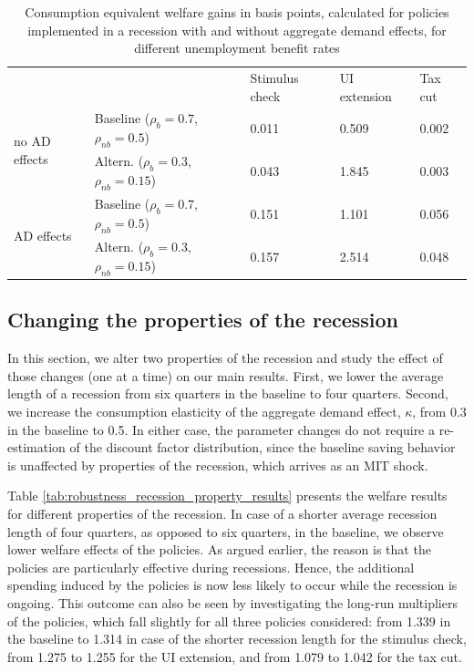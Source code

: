 \documentclass[\econtexRoot/HAFiscal]{subfiles}
\begin{document}
\begin{table}[]
  \begin{center}
    \begin{tabular}{@{}lllll@{}}
      \toprule
      &                    & Stimulus check & UI extension & Tax cut \\ \cmidrule(l){1-5} 
      \multirow{2}{*}{no AD effects} 	& Baseline  ($\rho_{b}=0.7$, $\rho_{nb}=0.5$) 		& 0.011          & 0.509        & 0.002   \\
      & Altern.  ($\rho_{b}=0.3$, $\rho_{nb}=0.15$) 	& 0.043          & 1.845        & 0.003   \\ \cmidrule(l){1-5} 
      \multirow{2}{*}{AD effects}		& Baseline  ($\rho_{b}=0.7$, $\rho_{nb}=0.5$)    	& 0.151          & 1.101        & 0.056   \\
      & Altern.  ($\rho_{b}=0.3$, $\rho_{nb}=0.15$)    & 0.157          & 2.514        & 0.048   \\ \cmidrule(l){1-5} 
    \end{tabular}
    \caption{Consumption equivalent welfare gains in basis points, calculated for policies implemented in a recession with and without aggregate demand effects, for different unemployment benefit rates}
    \notinsubfile{\label{tab:robustness_benefit_results}}
  \end{center}
\end{table}




\FloatBarrier
\hypertarget{changing-the-properties-of-the-recession}{}\par\subsection{Changing the properties of the recession}

In this section, we alter two properties of the recession and study the effect of those changes (one at a time) on our main results. First, we lower the average length of a recession from six quarters in the baseline to four quarters. Second, we increase the consumption elasticity of the aggregate demand effect, $\kappa$, from 0.3 in the baseline to 0.5. In either case, the parameter changes do not require a re-estimation of the discount factor distribution, since the baseline saving behavior is unaffected by properties of the recession, which arrives as an MIT shock. 

Table \ref{tab:robustness_recession_property_results} presents the welfare results for different properties of the recession. In case of a shorter average recession length of four quarters, as opposed to six quarters, in the baseline, we observe lower welfare effects of the policies. As argued earlier, the reason is that the policies are particularly effective during recessions. Hence, the additional spending induced by the policies is now less likely to occur while the recession is ongoing. This outcome can also be seen by investigating the long-run multipliers of the policies, which fall slightly for all three policies considered: from 1.339 in the baseline to 1.314 in case of the shorter recession length for the stimulus check, from 1.275 to 1.255 for the UI extension, and from 1.079 to 1.042 for the tax cut.
\end{document}
